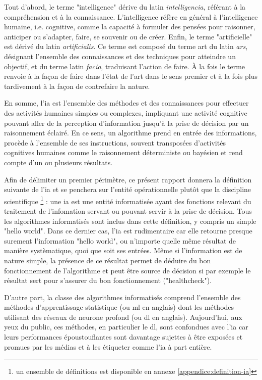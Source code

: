 Tout d'abord, le terme "intelligence" dérive du latin \textit{intelligencia}, référant à la compréhension et à la connaissance. L'intelligence réfère en général à l'intelligence humaine, i.e. cognitive, comme la capacité à formuler des pensées pour raisonner, anticiper ou s'adapter, faire, se souvenir ou de créer.
Enfin, le terme "artificielle" est dérivé du latin \textit{artificialis}. Ce terme est composé du terme art du latin \textit{ars}, désignant l'ensemble des connaissances et des techniques pour atteindre un objectif, et du terme latin \textit{facio}, traduisant l'action de faire. À la fois le terme renvoie à la façon de faire dans l'état de l'art dans le sens premier et à la fois plus tardivement à la façon de contrefaire la nature.

En somme, l'\gls{ia} est l'ensemble des méthodes et des connaissances pour effectuer des activités humaines simples ou complexes, impliquant une activité cognitive pouvant aller de la perception d'information jusqu'à la prise de décision par un raisonnement éclairé. En ce sens, un algorithme prend en entrée des informations, procède à l'ensemble de ses instructions, souvent transposées d'activités cognitives humaines comme le raisonnement déterministe ou bayésien et rend compte d'un ou plusieurs résultats.

Afin de délimiter un premier périmètre, ce présent rapport donnera la définition suivante de l'\gls{ia} et se penchera sur l'entité opérationnelle plutôt que la discipline scientifique \footnote{un ensemble de définitions est disponible en annexe \ref{appendice:definition-ia}} : une \gls{ia} est une entité informatisée ayant des fonctions relevant du traitement de l'infomation servant ou pouvant servir à la prise de décision. Tous les algorithmes informatisés sont inclus dans cette définition, y compris un simple "hello world". Dans ce dernier cas, l'\gls{ia} est rudimentaire car elle retourne presque surement l'information "hello world", ou n'importe quelle même résultat de manière systèmatique, quoi que soit ses entrées. Même si l'information est de nature simple, la présence de ce résultat permet de déduire du bon fonctionnement de l'algorithme et peut être source de décision si par exemple le résultat sert pour s'assurer du bon fonctionnement ("healthcheck").

D'autre part, la classe des algorithmes informatisés comprend l'ensemble des méthodes d'apprentissage statistique (ou \gls{ml} en anglais) dont les méthodes utilisant des réseaux de neurone profond (ou \gls{dl} en anglais). Aujourd'hui, aux yeux du public, ces méthodes, en particulier le \gls{dl}, sont confondues avec l'\gls{ia} car leurs performances époustouflantes sont davantage sujettes à être exposées et promues par les médias et à les étiqueter comme l'\gls{ia} à part entière.


